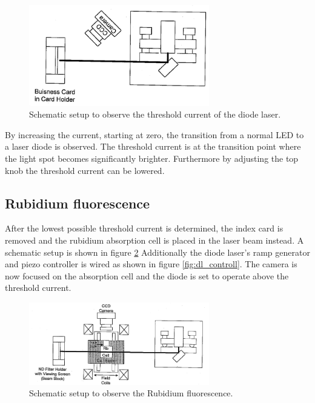 \begin{figure}
  \centering
  \includegraphics[width=0.7\textwidth]{setup1.png}
  \caption{Schematic setup to observe the threshold current of the diode laser.\cite{V61}}
  \label{fig:setup1}
\end{figure}
By increasing the current, starting at zero, the transition from
a normal LED to a laser diode is observed.
The threshold current is at the
transition point where the light spot becomes significantly brighter.
Furthermore by adjusting the top knob the threshold current can be lowered.


\subsection{Rubidium fluorescence}
\label{subsec:RB_fluorescence}

After the lowest possible threshold current is determined, the
index card is removed and
the rubidium absorption cell
is placed in the laser beam instead.
A schematic setup is shown in figure \ref{fig:setup2}
Additionally the diode laser's ramp generator and  piezo controller is wired as shown in figure \ref{fig:dl_controll}.
The camera is now
focused on the absorption cell and
the diode is set to operate above the threshold current.
\begin{figure}
  \centering
  \includegraphics[width=0.7\textwidth]{setup2.png}
  \caption{Schematic setup to observe the Rubidium fluorescence.\cite{V61}}
  \label{fig:setup2}
\end{figure}

